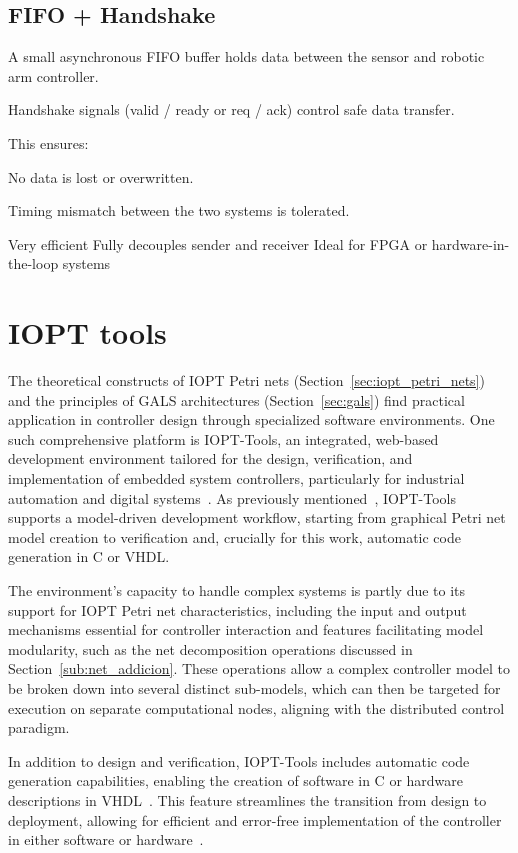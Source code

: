 \subsection{FIFO + Handshake}
\label{sub:fifo+handshake}

A small asynchronous FIFO buffer holds data between the sensor and robotic arm controller.

Handshake signals (valid / ready or req / ack) control safe data transfer.

This ensures:

No data is lost or overwritten.

Timing mismatch between the two systems is tolerated.

Very efficient
 Fully decouples sender and receiver
Ideal for FPGA or hardware-in-the-loop systems

\section{IOPT tools}
\label{sec:iopt_tools}



The theoretical constructs of IOPT Petri nets (Section~\ref{sec:iopt_petri_nets}) and the principles of GALS architectures (Section~\ref{sec:gals}) find practical application in controller design through specialized software environments. One such comprehensive platform is IOPT-Tools, an integrated, web-based development environment tailored for the design, verification, and implementation of embedded system controllers, particularly for industrial automation and digital systems~\cite{iopttools}. As previously mentioned~\cite{iopttools}, IOPT-Tools supports a model-driven development workflow, starting from graphical Petri net model creation to verification and, crucially for this work, automatic code generation in C or VHDL.

The environment's capacity to handle complex systems is partly due to its support for IOPT Petri net characteristics, including the input and output mechanisms essential for controller interaction and features facilitating model modularity, such as the net decomposition operations discussed in Section~\ref{sub:net_addicion}. These operations allow a complex controller model to be broken down into several distinct sub-models, which can then be targeted for execution on separate computational nodes, aligning with the distributed control paradigm.


In addition to design and verification, IOPT-Tools includes automatic code generation capabilities, enabling the creation of software in C or hardware descriptions in VHDL~\cite{vhld}. This feature streamlines the transition from design to deployment, allowing for efficient and error-free implementation of the controller in either software or hardware~\cite{manual}.

